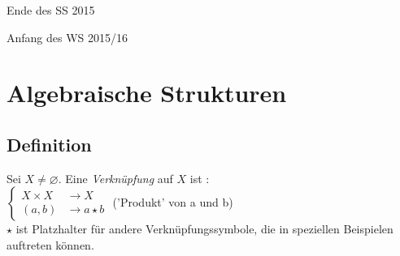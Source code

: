 

\resetHeadWidth
\newpage
\tableofcontents
\listoffigures
\clearpage
\setcounter{section}{-1}
\begin{center}
\Huge Ende des SS 2015
\end{center}

\newpage
\begin{center}
\Huge Anfang des WS 2015/16
\end{center}\section{Algebraische Strukturen}
\subsection{Definition}\label{sec:1.1}
Sei $X \neq \varnothing$. Eine \emph{Verknüpfung} auf $X$ ist : \\ $\begin{cases}
X \times X &\longrightarrow X\\
(a,b) &\longrightarrow a \star b
\end{cases}$ ('Produkt' von a und b)\\
$\star$ ist Platzhalter für andere Verknüpfungssymbole, die in speziellen Beispielen auftreten können.
